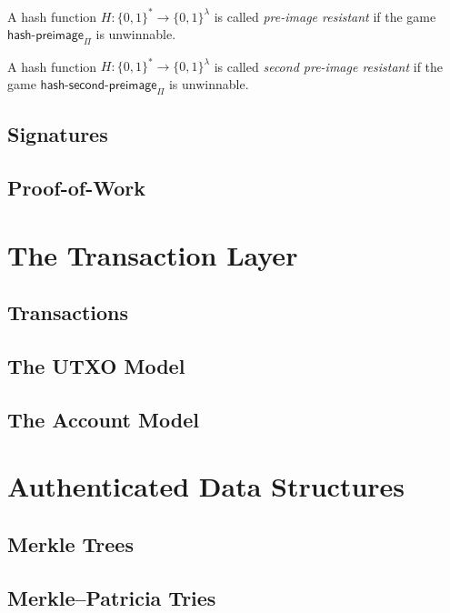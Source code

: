 


\begin{definition}
  A hash function $H: \{0, 1\}^* \longrightarrow \{0, 1\}^\lambda$ is called
  \emph{pre-image resistant} if the game $\textsf{hash-preimage}_\Pi$ is unwinnable.
\end{definition}

\begin{definition}
  A hash function $H: \{0, 1\}^* \longrightarrow \{0, 1\}^\lambda$ is called
  \emph{second pre-image resistant} if the game $\textsf{hash-second-preimage}_\Pi$ is unwinnable.
\end{definition}

\subsection{Signatures}
\subsection{Proof-of-Work}

\section{The Transaction Layer}
\subsection{Transactions}
\subsection{The UTXO Model}
\subsection{The Account Model}

\section{Authenticated Data Structures}
\subsection{Merkle Trees}
\subsection{Merkle–Patricia Tries}

